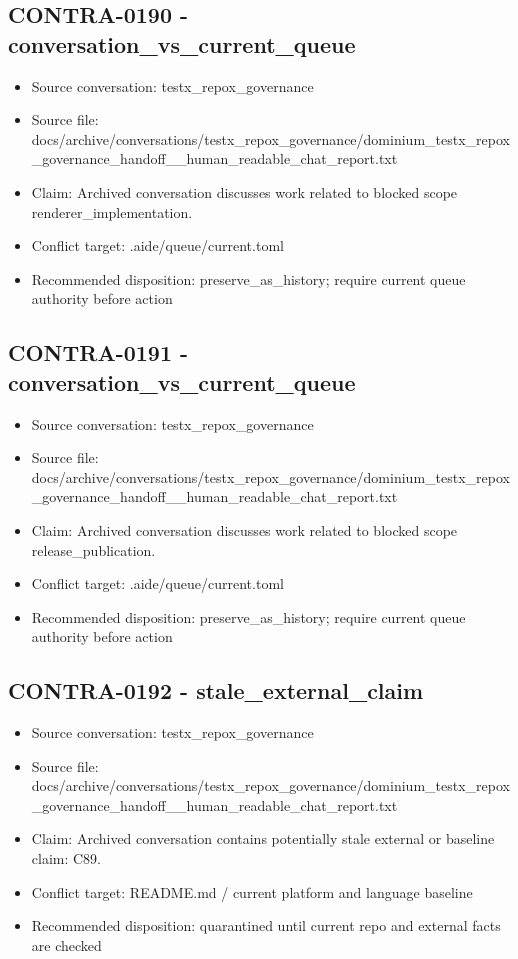 \documentclass[11pt,a4paper]{report}
\begin{document}
\subsection{CONTRA-0190 - conversation\_vs\_current\_queue}

\begin{itemize}
\item Source conversation: testx\_repox\_governance
\item Source file: docs/archive/conversations/testx\_repox\_governance/dominium\_testx\_repox\_governance\_handoff\_\_human\_readable\_chat\_report.txt
\item Claim: Archived conversation discusses work related to blocked scope renderer\_implementation.
\item Conflict target: .aide/queue/current.toml
\item Recommended disposition: preserve\_as\_history; require current queue authority before action
\end{itemize}

\subsection{CONTRA-0191 - conversation\_vs\_current\_queue}

\begin{itemize}
\item Source conversation: testx\_repox\_governance
\item Source file: docs/archive/conversations/testx\_repox\_governance/dominium\_testx\_repox\_governance\_handoff\_\_human\_readable\_chat\_report.txt
\item Claim: Archived conversation discusses work related to blocked scope release\_publication.
\item Conflict target: .aide/queue/current.toml
\item Recommended disposition: preserve\_as\_history; require current queue authority before action
\end{itemize}

\subsection{CONTRA-0192 - stale\_external\_claim}

\begin{itemize}
\item Source conversation: testx\_repox\_governance
\item Source file: docs/archive/conversations/testx\_repox\_governance/dominium\_testx\_repox\_governance\_handoff\_\_human\_readable\_chat\_report.txt
\item Claim: Archived conversation contains potentially stale external or baseline claim: C89.
\item Conflict target: README.md / current platform and language baseline
\item Recommended disposition: quarantined until current repo and external facts are checked
\end{itemize}
\end{document}
